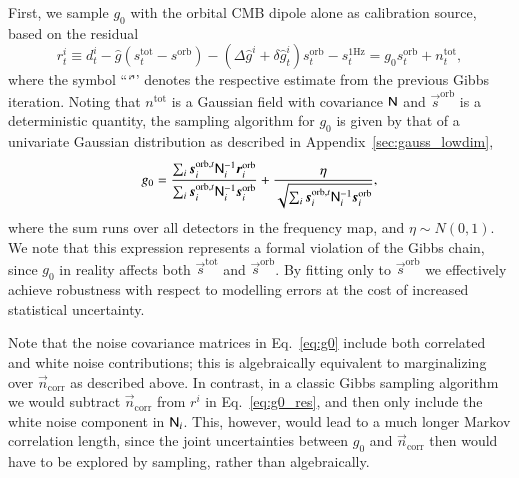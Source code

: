 \documentclass[twocolumn]{aa}
\newcommand{\n}[0]{\vec{n}}
\newcommand{\s}[0]{\vec{s}}
\newcommand{\N}[0]{\tens{N}}
\renewcommand{\r}[0]{\vec{r}}
\begin{document}
First, we sample $g_0$ with the orbital CMB dipole alone as
calibration source, based on the residual
\begin{equation}
  r^i_t \equiv d^i_{t} - \hat{g} (s^{\mathrm{tot}}_{t} -
  s^{\mathrm{orb}}) - (\Delta \hat{g}^i + \delta \hat{g}_t^i) s^{\mathrm{orb}}_{t} - s^{\mathrm{1Hz}}_t
 =  g_0 s^{\mathrm{orb}}_{t} + n^{\mathrm{tot}}_{t},
\end{equation}
where the symbol ``\char`\^'' denotes the respective estimate from the
previous Gibbs iteration. Noting that $n^{\mathrm{tot}}$ is a Gaussian
field with covariance $\N$ and $\s^{\mathrm{orb}}$ is a deterministic
quantity, the sampling algorithm for $g_0$ is given by that of a
univariate Gaussian distribution as described in
Appendix~\ref{sec:gauss_lowdim},
\begin{equation}
  g_0 =
  \frac{\sum_i\s_i^{\mathrm{orb},t}\N_i^{-1}\r_i^{\mathrm{orb}}}{\sum_i\s_i^{\mathrm{orb},t}\N_i^{-1}\s_i^{\mathrm{orb}}}
  +
  \frac{\eta}{\sqrt{\sum_i\s_i^{\mathrm{orb},t}\N_i^{-1}\s_i^{\mathrm{orb}}}},
  \label{eq:g0}
\end{equation}
where the sum runs over all detectors in the frequency map, and $\eta
\sim N(0,1)$.  We note that this expression represents a formal
violation of the Gibbs chain, since $g_0$ in reality affects both
$\s^{\mathrm{tot}}$ and $\s^{\mathrm{orb}}$. By fitting only to
$\s^{\mathrm{orb}}$ we effectively achieve robustness with respect to
modelling errors at the cost of increased statistical
uncertainty.

Note that the noise covariance matrices in Eq.~\eqref{eq:g0} include
both correlated and white noise contributions; this is algebraically
equivalent to marginalizing over $\n_{\mathrm{corr}}$ as described
above. In contrast, in a classic Gibbs sampling algorithm we would
subtract $\n_{\mathrm{corr}}$ from $r^i$ in Eq.~\eqref{eq:g0_res}, and
then only include the white noise component in $\N_i$. This, however,
would lead to a much longer Markov correlation length, since the joint
uncertainties between $g_0$ and $\n_{\mathrm{corr}}$ then would have
to be explored by sampling, rather than algebraically.
\end{document}
